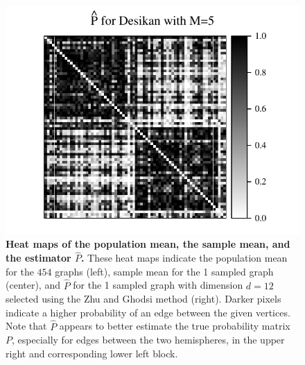 \documentclass[simplex.tex]{subfiles}
\begin{document}
\begin{figure}[!h]
\begin{cframed}
\includegraphics[height=.205\textheight]{../../figs/Phat_desikan_m1.pdf}
\caption{{\bf Heat maps of the population mean, the sample mean, and the estimator $\hat{P}$.}
These heat maps indicate the population mean for the $454$ graphs (left), sample mean for the 1 sampled graph (center), and $\hat{P}$ for the 1 sampled graph with dimension $d=12$ selected using the Zhu and Ghodsi method (right).
Darker pixels indicate a higher probability of an edge between the given vertices.
Note that $\hat{P}$ appears to better estimate the true probability matrix $P$, especially for edges between the two hemispheres, in the upper right and corresponding lower left block.
}
\label{fig:Matrix_desikan_m1}
\end{cframed}
\end{figure}
\end{document}
